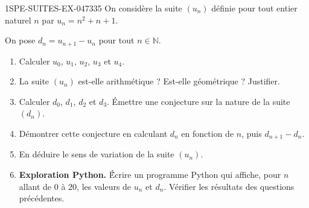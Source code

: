 \begin{exercice}{1SPE-SUITES-EX-047}{3}{35}
On consid\`ere la suite $(u_n)$ d\'efinie pour tout entier naturel $n$ par $u_n = n^2 + n + 1$.

On pose $d_n = u_{n+1} - u_n$ pour tout $n \in \mathbb{N}$.

\begin{enumerate}
  \item Calculer $u_0$, $u_1$, $u_2$, $u_3$ et $u_4$.

  \item La suite $(u_n)$ est-elle arithm\'etique ? Est-elle g\'eom\'etrique ? Justifier.

  \item Calculer $d_0$, $d_1$, $d_2$ et $d_3$. \'Emettre une conjecture sur la nature de la suite $(d_n)$.

  \item D\'emontrer cette conjecture en calculant $d_n$ en fonction de $n$, puis $d_{n+1} - d_n$.

  \item En d\'eduire le sens de variation de la suite $(u_n)$.

  \item \textbf{Exploration Python.} \'Écrire un programme Python qui affiche, pour $n$ allant de $0$ \`a $20$, les valeurs de $u_n$ et $d_n$. V\'erifier les r\'esultats des questions pr\'ec\'edentes.
\end{enumerate}
\end{exercice}

